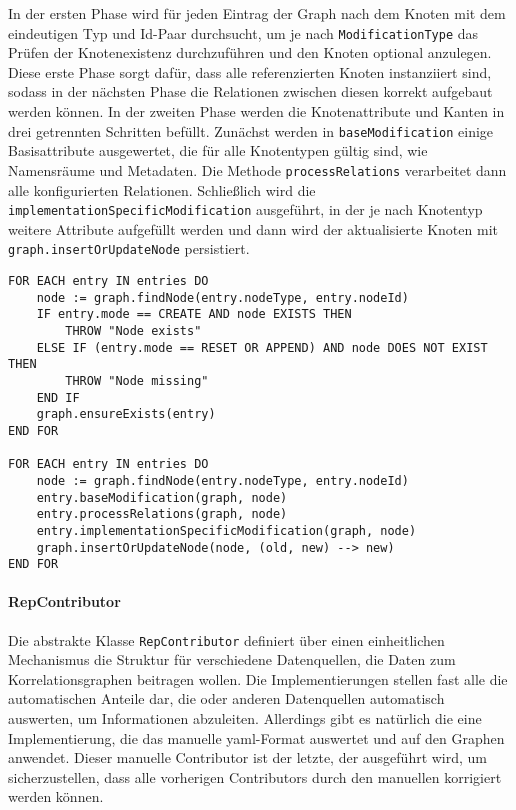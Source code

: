 In der ersten Phase wird für jeden Eintrag der Graph nach dem Knoten mit dem eindeutigen Typ und Id-Paar durchsucht, um je nach \texttt{ModificationType} das Prüfen der Knotenexistenz durchzuführen und den Knoten optional anzulegen.
Diese erste Phase sorgt dafür, dass alle referenzierten Knoten instanziiert sind, sodass in der nächsten Phase die Relationen zwischen diesen korrekt aufgebaut werden können.
In der zweiten Phase werden die Knotenattribute und Kanten in drei getrennten Schritten befüllt.
Zunächst werden in \texttt{baseModification} einige Basisattribute ausgewertet, die für alle Knotentypen gültig sind, wie Namensräume und Metadaten.
Die Methode \texttt{processRelations} verarbeitet dann alle konfigurierten Relationen.
Schließlich wird die \texttt{implementationSpecificModification} ausgeführt, in der je nach Knotentyp weitere Attribute aufgefüllt werden und dann wird der aktualisierte Knoten mit \texttt{graph.insertOrUpdateNode} persistiert.

\begin{lstlisting}[language=pseudo,caption={Ablauf des Modifikationssystems für eine Menge an Modifikationen},label=lst:modifikation-pseudocode,basicstyle=\ttfamily\scriptsize]
FOR EACH entry IN entries DO
    node := graph.findNode(entry.nodeType, entry.nodeId)
    IF entry.mode == CREATE AND node EXISTS THEN
        THROW "Node exists"
    ELSE IF (entry.mode == RESET OR APPEND) AND node DOES NOT EXIST THEN
        THROW "Node missing"
    END IF
    graph.ensureExists(entry)
END FOR

FOR EACH entry IN entries DO
    node := graph.findNode(entry.nodeType, entry.nodeId)
    entry.baseModification(graph, node)
    entry.processRelations(graph, node)
    entry.implementationSpecificModification(graph, node)
    graph.insertOrUpdateNode(node, (old, new) --> new)
END FOR
\end{lstlisting}

\paragraph{RepContributor}

Die abstrakte Klasse \texttt{RepContributor} definiert über einen einheitlichen Mechanismus die Struktur für verschiedene Datenquellen, die Daten zum Korrelationsgraphen beitragen wollen.
Die Implementierungen stellen fast alle die automatischen Anteile dar, die  oder anderen Datenquellen automatisch auswerten, um Informationen abzuleiten.
Allerdings gibt es natürlich die eine Implementierung, die das manuelle \acrshort{yaml}-Format auswertet und auf den Graphen anwendet.
Dieser manuelle Contributor ist der letzte, der ausgeführt wird, um sicherzustellen, dass alle vorherigen Contributors durch den manuellen korrigiert werden können.

